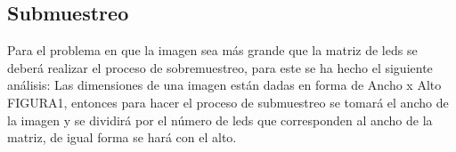 \documentclass{article}
\begin{document}
\subsection{Submuestreo}
Para el problema en que la imagen sea más grande que la matriz de leds se deberá realizar el proceso de sobremuestreo, para este se ha hecho el siguiente análisis:
Las dimensiones de una imagen están dadas en forma de Ancho x Alto FIGURA1, entonces para hacer el proceso de submuestreo se tomará el ancho de la imagen y se dividirá por el número de leds que corresponden al ancho de la matriz, de igual forma se hará con el alto.
\end{document}
